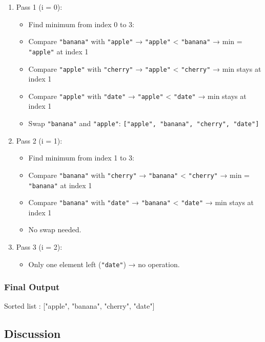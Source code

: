 \documentclass{article}
\begin{document}
\begin{enumerate}
    \item Pass 1 (i = 0):
    \begin{itemize}
        \item Find minimum from index 0 to 3:
        \item Compare \texttt{"banana"} with \texttt{"apple"} → \texttt{"apple"} < \texttt{"banana"} → min = \texttt{"apple"} at index 1
        \item Compare \texttt{"apple"} with \texttt{"cherry"} → \texttt{"apple"} < \texttt{"cherry"} → min stays at index 1
        \item Compare \texttt{"apple"} with \texttt{"date"} → \texttt{"apple"} < \texttt{"date"} → min stays at index 1
        \item Swap \texttt{"banana"} and \texttt{"apple"}: \texttt{["apple", "banana", "cherry", "date"]}
    \end{itemize}
    
    \item Pass 2 (i = 1):
    \begin{itemize}
        \item Find minimum from index 1 to 3:
        \item Compare \texttt{"banana"} with \texttt{"cherry"} → \texttt{"banana"} < \texttt{"cherry"} → min = \texttt{"banana"} at index 1
        \item Compare \texttt{"banana"} with \texttt{"date"} → \texttt{"banana"} < \texttt{"date"} → min stays at index 1
        \item No swap needed.
    \end{itemize}

    \item Pass 3 (i = 2):
    \begin{itemize}
        \item Only one element left (\texttt{"date"}) → no operation.
    \end{itemize}
\end{enumerate}

\subsubsection*{Final Output}
Sorted list : ["apple", "banana", "cherry", "date"]
\subsection*{Discussion}
\end{document}
